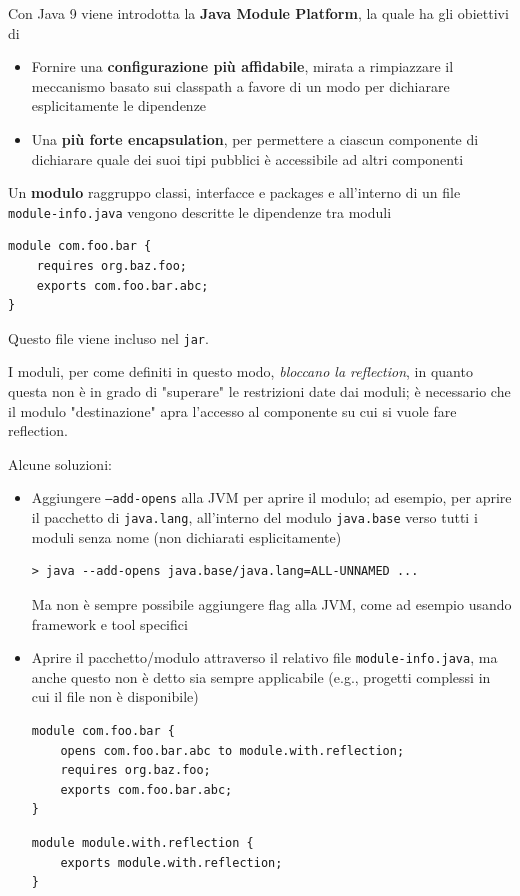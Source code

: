 Con Java 9 viene introdotta la \textbf{Java Module Platform}, la quale ha gli obiettivi di
\begin{itemize}
    \item Fornire una \textbf{configurazione più affidabile}, mirata a rimpiazzare il meccanismo basato sui classpath a favore di un modo per dichiarare esplicitamente le dipendenze

    \item Una \textbf{più forte encapsulation}, per permettere a ciascun componente di dichiarare quale dei suoi tipi pubblici è accessibile ad altri componenti
\end{itemize}

Un \textbf{modulo} raggruppo classi, interfacce e packages e all'interno di un file \texttt{module-info.java} vengono descritte le dipendenze tra moduli
\begin{verbatim}
module com.foo.bar {
    requires org.baz.foo;
    exports com.foo.bar.abc;
}
\end{verbatim}
Questo file viene incluso nel \texttt{jar}.

I moduli, per come definiti in questo modo, \textit{bloccano la reflection}, in quanto questa non è in grado di "superare" le restrizioni date dai moduli; è necessario che il modulo "destinazione" apra l'accesso al componente su cui si vuole fare reflection.

Alcune soluzioni:
\begin{itemize}
    \item Aggiungere \texttt{--add-opens} alla JVM per aprire il modulo; ad esempio, per aprire il pacchetto di \texttt{java.lang}, all'interno del modulo \texttt{java.base} verso tutti i moduli senza nome (non dichiarati esplicitamente)
    \begin{verbatim}
> java --add-opens java.base/java.lang=ALL-UNNAMED ...
    \end{verbatim}
    Ma non è sempre possibile aggiungere flag alla JVM, come ad esempio usando framework e tool specifici

    \item Aprire il pacchetto/modulo attraverso il relativo file \texttt{module-info.java}, ma anche questo non è detto sia sempre applicabile (e.g., progetti complessi in cui il file non è disponibile)
    \begin{verbatim}
module com.foo.bar {
    opens com.foo.bar.abc to module.with.reflection;
    requires org.baz.foo;
    exports com.foo.bar.abc;
}
    \end{verbatim}
    \begin{verbatim}
module module.with.reflection {
    exports module.with.reflection;
}
    \end{verbatim}
\end{itemize}


